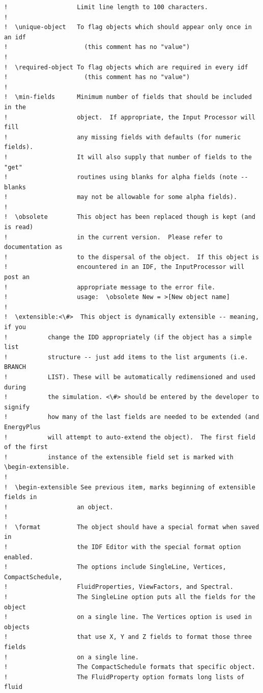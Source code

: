 \begin{lstlisting}
!                   Limit line length to 100 characters.
!
!  \unique-object   To flag objects which should appear only once in an idf
!                     (this comment has no "value")
!
!  \required-object To flag objects which are required in every idf
!                     (this comment has no "value")
!
!  \min-fields      Minimum number of fields that should be included in the
!                   object.  If appropriate, the Input Processor will fill
!                   any missing fields with defaults (for numeric fields).
!                   It will also supply that number of fields to the "get"
!                   routines using blanks for alpha fields (note -- blanks
!                   may not be allowable for some alpha fields).
!
!  \obsolete        This object has been replaced though is kept (and is read)
!                   in the current version.  Please refer to documentation as
!                   to the dispersal of the object.  If this object is
!                   encountered in an IDF, the InputProcessor will post an
!                   appropriate message to the error file.
!                   usage:  \obsolete New = >[New object name]
!
!  \extensible:<\#>  This object is dynamically extensible -- meaning, if you
!           change the IDD appropriately (if the object has a simple list
!           structure -- just add items to the list arguments (i.e. BRANCH
!           LIST). These will be automatically redimensioned and used during
!           the simulation. <\#> should be entered by the developer to signify
!           how many of the last fields are needed to be extended (and EnergyPlus
!           will attempt to auto-extend the object).  The first field of the first
!           instance of the extensible field set is marked with \begin-extensible.
!
!  \begin-extensible See previous item, marks beginning of extensible fields in
!                   an object.
!
!  \format          The object should have a special format when saved in
!                   the IDF Editor with the special format option enabled.
!                   The options include SingleLine, Vertices, CompactSchedule,
!                   FluidProperties, ViewFactors, and Spectral.
!                   The SingleLine option puts all the fields for the object
!                   on a single line. The Vertices option is used in objects
!                   that use X, Y and Z fields to format those three fields
!                   on a single line.
!                   The CompactSchedule formats that specific object.
!                   The FluidProperty option formats long lists of fluid

\end{lstlisting}
